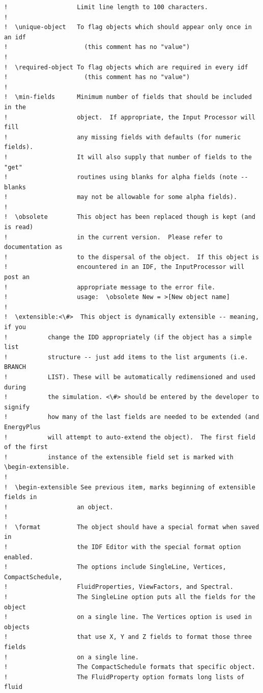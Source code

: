 \begin{lstlisting}
!                   Limit line length to 100 characters.
!
!  \unique-object   To flag objects which should appear only once in an idf
!                     (this comment has no "value")
!
!  \required-object To flag objects which are required in every idf
!                     (this comment has no "value")
!
!  \min-fields      Minimum number of fields that should be included in the
!                   object.  If appropriate, the Input Processor will fill
!                   any missing fields with defaults (for numeric fields).
!                   It will also supply that number of fields to the "get"
!                   routines using blanks for alpha fields (note -- blanks
!                   may not be allowable for some alpha fields).
!
!  \obsolete        This object has been replaced though is kept (and is read)
!                   in the current version.  Please refer to documentation as
!                   to the dispersal of the object.  If this object is
!                   encountered in an IDF, the InputProcessor will post an
!                   appropriate message to the error file.
!                   usage:  \obsolete New = >[New object name]
!
!  \extensible:<\#>  This object is dynamically extensible -- meaning, if you
!           change the IDD appropriately (if the object has a simple list
!           structure -- just add items to the list arguments (i.e. BRANCH
!           LIST). These will be automatically redimensioned and used during
!           the simulation. <\#> should be entered by the developer to signify
!           how many of the last fields are needed to be extended (and EnergyPlus
!           will attempt to auto-extend the object).  The first field of the first
!           instance of the extensible field set is marked with \begin-extensible.
!
!  \begin-extensible See previous item, marks beginning of extensible fields in
!                   an object.
!
!  \format          The object should have a special format when saved in
!                   the IDF Editor with the special format option enabled.
!                   The options include SingleLine, Vertices, CompactSchedule,
!                   FluidProperties, ViewFactors, and Spectral.
!                   The SingleLine option puts all the fields for the object
!                   on a single line. The Vertices option is used in objects
!                   that use X, Y and Z fields to format those three fields
!                   on a single line.
!                   The CompactSchedule formats that specific object.
!                   The FluidProperty option formats long lists of fluid

\end{lstlisting}
